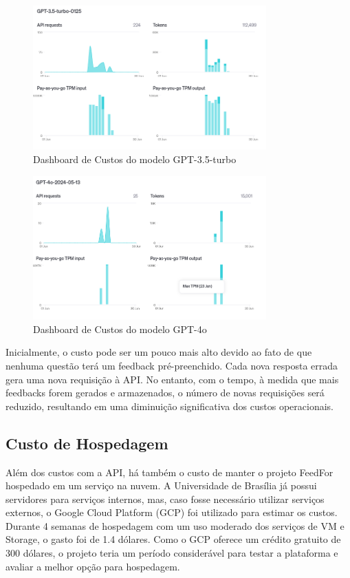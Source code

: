 \begin{figure}[H]
    \centering
    \includegraphics[width=0.8\textwidth]{figuras/cost_gpt_35.png}
    \caption{Dashboard de Custos do modelo GPT-3.5-turbo}
    \label{fig:first_phase}
\end{figure}

\begin{figure}[H]
    \centering
    \includegraphics[width=0.8\textwidth]{figuras/cost_gpt_4o.png}
    \caption{Dashboard de Custos do modelo GPT-4o}
    \label{fig:first_phase}
\end{figure}

Inicialmente, o custo pode ser um pouco mais alto devido ao fato de que nenhuma questão terá um feedback pré-preenchido. Cada nova resposta errada gera uma nova requisição à API. No entanto, com o tempo, à medida que mais feedbacks forem gerados e armazenados, o número de novas requisições será reduzido, resultando em uma diminuição significativa dos custos operacionais.

\subsection{Custo de Hospedagem}

Além dos custos com a API, há também o custo de manter o projeto FeedFor hospedado em um serviço na nuvem. A Universidade de Brasília já possui servidores para serviços internos, mas, caso fosse necessário utilizar serviços externos, o Google Cloud Platform (GCP) foi utilizado para estimar os custos. Durante 4 semanas de hospedagem com um uso moderado dos serviços de VM e Storage, o gasto foi de 1.4 dólares. Como o GCP oferece um crédito gratuito de 300 dólares, o projeto teria um período considerável para testar a plataforma e avaliar a melhor opção para hospedagem.

